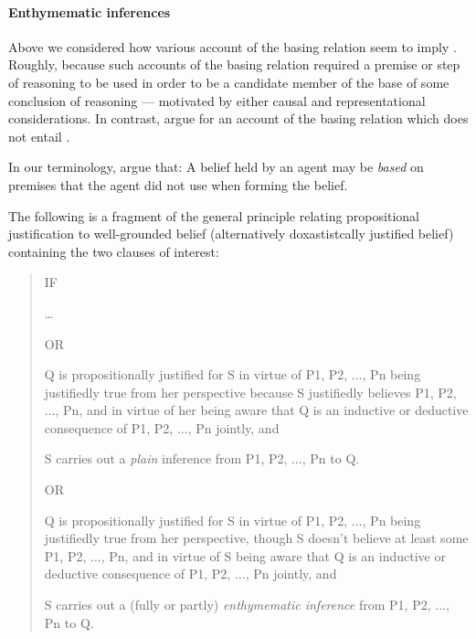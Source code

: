 \paragraph{Enthymematic inferences}

\begin{note}
  Above we considered how various account of the basing relation seem to imply \ESU{}.
  Roughly, because such accounts of the basing relation required a premise or step of reasoning to be used in order to be a candidate member of the base of some conclusion of reasoning --- motivated by either causal and representational considerations.
  In contrast, \citeauthor{Moretti:2019wx} argue for an account of the basing relation which does not entail \ESU{}.

  In our terminology, \citeauthor{Moretti:2019wx} argue that: A belief held by an agent may be \emph{based} on premises that the agent did not use when forming the belief.

  The following is a fragment of the general principle relating propositional justification to well-grounded belief (alternatively doxastistcally justified belief) containing the two clauses of interest:

  \begin{quote}
    IF

    \dots

    OR

    \begin{enumerate*}[label=(\arabic*.2\(^{\ast}\))]
    \item\label{LT:1.2} Q is propositionally justified for S in virtue of P1, P2, \(\dots\), Pn being justifiedly true from her perspective because S justifiedly believes P1, P2, \(\dots\), Pn, and in virtue of her being aware that Q is an inductive or deductive consequence of P1, P2, \(\dots\), Pn jointly, and
    \item\label{LT:2.2} S carries out a \emph{plain} inference from P1, P2, \(\dots\), Pn to Q.
    \end{enumerate*}

    OR

    \begin{enumerate*}[label=(\arabic*.3), ref=(\arabic*.3)]
    \item\label{LT:1.3} Q is propositionally justified for S in virtue of P1, P2, \(\dots\), Pn being justifiedly true from her perspective, though S doesn't believe at least some P1, P2, \(\dots\), Pn, and in virtue of S being aware that Q is an inductive or deductive consequence of P1, P2, \(\dots\), Pn jointly, and
    \item\label{LT:2.3} S carries out a (fully or partly) \emph{enthymematic inference} from P1, P2, \(\dots\), Pn to Q.
    \end{enumerate*}


\end{quote}
\end{note}
